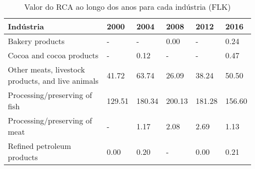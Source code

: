 \begin{table}
\centering
\caption{Valor do RCA ao longo dos anos para cada indústria (FLK)}
\begin{tabular}{p{6cm}p{1.5cm}p{1.5cm}p{1.5cm}p{1.5cm}p{1.5cm}}
\toprule
                                        Indústria &   2000 &   2004 &   2008 &   2012 &   2016 \\
\midrule
                                  Bakery products &      - &      - &   0.00 &      - &   0.24 \\
                         Cocoa and cocoa products &      - &   0.12 &      - &      - &   0.47 \\
Other meats, livestock products, and live animals &  41.72 &  63.74 &  26.09 &  38.24 &  50.50 \\
                    Processing/preserving of fish & 129.51 & 180.34 & 200.13 & 181.28 & 156.60 \\
                    Processing/preserving of meat &      - &   1.17 &   2.08 &   2.69 &   1.13 \\
                       Refined petroleum products &   0.00 &   0.20 &      - &   0.00 &   0.21 \\
\bottomrule
\end{tabular}
\end{table}
